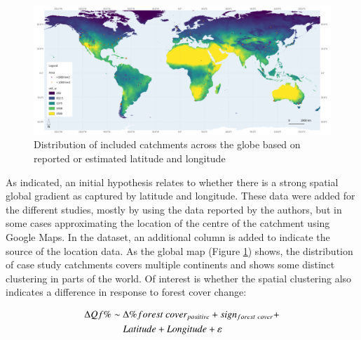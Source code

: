 \documentclass[]{elsarticle} %
\begin{document}
\begin{figure}
\includegraphics[width=0.9\linewidth]{../../data/FAOET0data2} \caption{Distribution of included catchments across the globe based on reported or estimated latitude and longitude}\label{fig:globalmap}
\end{figure}

As indicated, an initial hypothesis relates to whether there is a strong spatial global gradient as captured by latitude and longitude. These data were added for the different studies, mostly by using the data reported by the authors, but in some cases approximating the location of the centre of the catchment using Google Maps. In the dataset, an additional column is added to indicate the source of the location data. As the global map (Figure \ref{fig:globalmap}) shows, the distribution of case study catchments covers multiple continents and shows some distinct clustering in parts of the world. Of interest is whether the spatial clustering also indicates a difference in response to forest cover change:

\begin{align}
\Delta Qf \% \sim ~ & \Delta \% forest~cover_{positive} + sign_{forest~cover} + \notag \\ &  Latitude + Longitude + \varepsilon \label{eq:eq4}
\end{align}
\end{document}
